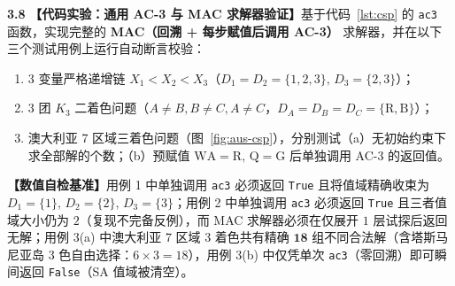 \textbf{3.8} \quad \textbf{【代码实验：通用 AC-3 与 MAC 求解器验证】}基于代码~\ref{lst:csp} 的 \texttt{ac3} 函数，实现完整的 \textbf{MAC（回溯 + 每步赋值后调用 AC-3）} 求解器，并在以下三个测试用例上运行自动断言校验：
\begin{enumerate}
  \item 3 变量严格递增链 $X_1<X_2<X_3$（$D_1=D_2=\{1,2,3\},\, D_3=\{2,3\}$）；
  \item 3 团 $K_3$ 二着色问题（$A\neq B, B\neq C, A\neq C$，$D_A=D_B=D_C=\{\text{R},\text{B}\}$）；
  \item 澳大利亚 7 区域三着色问题（图~\ref{fig:aus-csp}），分别测试（a）无初始约束下求全部解的个数；（b）预赋值 $\text{WA}=\text{R},\, \text{Q}=\text{G}$ 后单独调用 AC-3 的返回值。
\end{enumerate}
\textbf{【数值自检基准】}用例 1 中单独调用 \texttt{ac3} 必须返回 \texttt{True} 且将值域精确收束为 $D_1=\{1\},\, D_2=\{2\},\, D_3=\{3\}$；用例 2 中单独调用 \texttt{ac3} 必须返回 \texttt{True} 且三者值域大小仍为 $2$（复现不完备反例），而 MAC 求解器必须在仅展开 $1$ 层试探后返回无解；用例 3(a) 中澳大利亚 7 区域 3 着色共有精确 $\mathbf{18}$ 组不同合法解（含塔斯马尼亚岛 3 色自由选择：$6 \times 3 = 18$），用例 3(b) 中仅凭单次 \texttt{ac3}（零回溯）即可瞬间返回 \texttt{False}（\textsf{SA} 值域被清空）。
